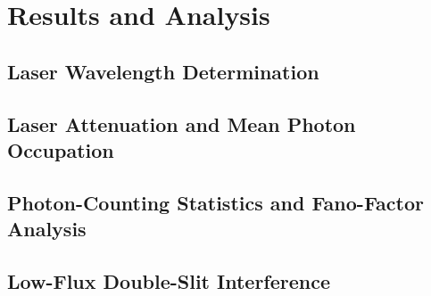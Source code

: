 \section{Results and Analysis}
\label{sec:results}


\subsection{Laser Wavelength Determination}
\label{sec:wavelength}

\subsection{Laser Attenuation and Mean Photon Occupation}
\label{sec:attenuation}

\subsection{Photon-Counting Statistics and Fano-Factor Analysis}
\label{sec:statistics}

\subsection{Low-Flux Double-Slit Interference}
\label{sec:interference}


